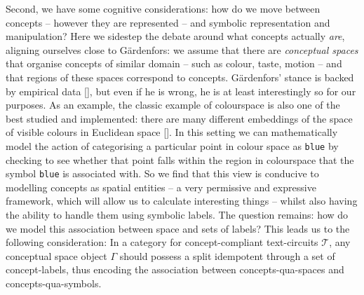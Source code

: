 \label{just:rel} Second, we have some cognitive considerations: how do we move between concepts -- however they are represented -- and symbolic representation and manipulation? Here we sidestep the debate around what concepts actually \emph{are}, aligning ourselves close to G\"{a}rdenfors: we assume that there are \emph{conceptual spaces} that organise concepts of similar domain -- such as colour, taste, motion -- and that regions of these spaces correspond to concepts. G\"{a}rdenfors' stance is backed by empirical data [], but even if he is wrong, he is at least interestingly so for our purposes. As an example, the classic example of colourspace is also one of the best studied and implemented: there are many different embeddings of the space of visible colours in Euclidean space []. In this setting we can mathematically model the action of categorising a particular point in colour space as \texttt{blue} by checking to see whether that point falls within the region in colourspace that the symbol \texttt{blue} is associated with. So we find that this view is conducive to modelling concepts as spatial entities -- a very permissive and expressive framework, which will allow us to calculate interesting things -- whilst also having the ability to handle them using symbolic labels. The question remains: how do we model this association between space and sets of labels? This leads us to the following consideration: In a category for concept-compliant text-circuits $\mathcal{T}$, any conceptual space object $\Gamma$ should possess a split idempotent through a set of concept-labels, thus encoding the association between concepts-qua-spaces and concepts-qua-symbols.\\

